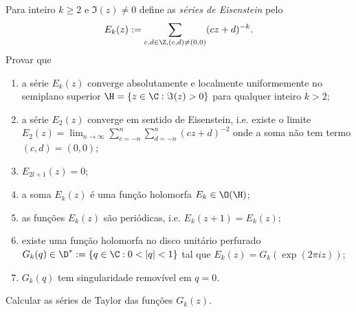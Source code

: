 \begin{problema}
Para inteiro $k\geq 2$ e $\Im(z)\neq 0$ define as \emph{séries de Eisenstein} pelo
\begin{equation}
E_k(z) := \sum_{c,d\in \Z, (c,d)\neq(0,0)} (cz+d)^{-k} .
\end{equation}
Provar que
\begin{enumerate}
\item a série $E_k(z)$ converge
absolutamente e localmente uniformemente no semiplano superior
$\H = \{z\in\C: \Im(z)>0\}$ para qualquer inteiro $k>2$;
\item a série $E_2(z)$ converge em sentido de Eisenstein,
i.e. existe o limite $E_2(z) = \lim_{n\to\infty} \sum_{c=-n}^n\sum_{d=-n}^n (cz+d)^{-2}$
onde a soma não tem termo $(c,d)=(0,0)$;
\item $E_{2l+1}(z) = 0$;
\item a soma $E_k(z)$ é uma função holomorfa $E_k \in \O(\H)$;
\item as funções $E_k(z)$ são periódicas, i.e. $E_k(z+1) = E_k(z)$;
\item existe uma função holomorfa no disco unitário perfurado
$G_k(q) \in \D^* := \{q\in\C: 0 < |q| < 1 \}$ tal que $E_k(z) = G_k(\exp(2\pi i z))$;
\item $G_k(q)$ tem singularidade removível em $q=0$.
\end{enumerate}
\end{problema}

\begin{problema}
Calcular as séries de Taylor das funções $G_k(z)$.
\end{problema}


